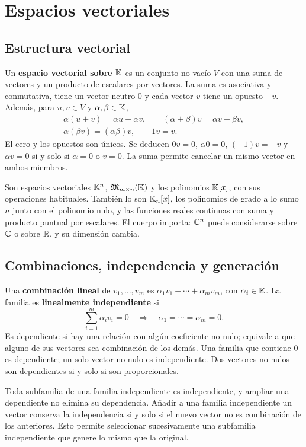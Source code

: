 \chapter{Espacios vectoriales}
\label{cap:espacios}

\section{Estructura vectorial}

Un \textbf{espacio vectorial sobre $\mathbb{K}$} es un conjunto no vacío $V$
con una suma de vectores y un producto de escalares por vectores.
La suma es asociativa y conmutativa, tiene un vector neutro $0$ y cada
vector $v$ tiene un opuesto $-v$. Además, para $u,v\in V$ y
$\alpha,\beta\in\mathbb{K}$,
\[
 \begin{gathered}
 \alpha(u+v)=\alpha u+\alpha v,\qquad
 (\alpha+\beta)v=\alpha v+\beta v,\\
 \alpha(\beta v)=(\alpha\beta)v,\qquad 1v=v.
 \end{gathered}
\]
El cero y los opuestos son únicos. Se deducen $0v=0$, $\alpha0=0$,
$(-1)v=-v$ y $\alpha v=0$ si y solo si $\alpha=0$ o $v=0$.
La suma permite cancelar un mismo vector en ambos miembros.

Son espacios vectoriales $\mathbb{K}^n$, $\mathfrak{M}_{m\times n}(\mathbb{K})$ y los polinomios
$\mathbb{K}[x]$, con sus operaciones habituales. También lo son
$\mathbb{K}_n[x]$, los polinomios de grado a lo sumo $n$ junto con el polinomio
nulo, y las funciones reales continuas con suma y producto puntual
por escalares. El cuerpo importa: $\mathbb{C}^n$ puede considerarse sobre
$\mathbb{C}$ o sobre $\mathbb{R}$, y su dimensión cambia.

\section{Combinaciones, independencia y generación}
\label{sec:generacion}

Una \textbf{combinación lineal} de $v_1,\ldots,v_m$ es
$\alpha_1v_1+\cdots+\alpha_mv_m$, con $\alpha_i\in\mathbb{K}$.
La familia es \textbf{linealmente independiente} si
\[
 \sum_{i=1}^m\alpha_iv_i=0\quad\Longrightarrow\quad
 \alpha_1=\cdots=\alpha_m=0.
\]
Es dependiente si hay una relación con algún coeficiente no nulo;
equivale a que alguno de sus vectores sea combinación de los demás.
Una familia que contiene $0$ es dependiente; un solo vector no nulo
es independiente. Dos vectores no nulos son dependientes si y solo si
son proporcionales.

Toda subfamilia de una familia independiente es independiente, y ampliar
una dependiente no elimina su dependencia. Añadir a una familia independiente
un vector conserva la independencia si y solo si el nuevo vector no es
combinación de los anteriores. Esto permite seleccionar sucesivamente
una subfamilia independiente que genere lo mismo que la original.

